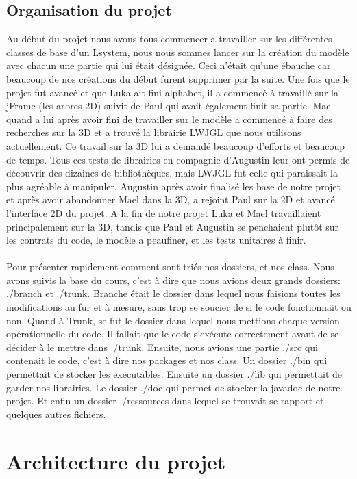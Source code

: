 \documentclass[a4paper,12pt]{article}
\begin{document}
\subsection{Organisation du projet}

Au début du projet nous avons tous commencer a travailler sur les différentes classes de base d'un Lsystem, nous nous sommes lancer sur la création du modèle avec chacun une partie qui lui était désignée. Ceci n'était qu'une ébauche car beaucoup de nos créations du début furent supprimer par la suite. Une fois que le projet fut avancé et que Luka ait fini alphabet, il a commencé à travaillé sur la jFrame (les arbres 2D) suivit de Paul qui avait également finit sa partie. Mael quand a lui après avoir fini de travailler sur le modèle a commencé à faire des recherches sur la 3D et a trouvé la librairie LWJGL que nous utilisons actuellement. Ce travail sur la 3D lui a demandé beaucoup d'efforts et beaucoup de temps. Tous ces tests de librairies en compagnie d'Augustin leur ont permis de découvrir des dizaines de bibliothèques, mais LWJGL fut celle qui paraissait la plus agréable à manipuler. Augustin après avoir finalisé les base de notre projet et après avoir abandonner Mael dans la 3D, a rejoint Paul sur la 2D et avancé l'interface 2D du projet. A la fin de notre projet Luka et Mael travaillaient principalement sur la 3D, tandis que Paul et Augustin se penchaient plutôt sur les contrats du code, le modèle a peaufiner, et les tests unitaires à finir.
\\\\
Pour présenter rapidement comment sont triés nos dossiers, et nos class. Nous avons suivis la base du cours, c'est à dire que nous avions deux grands dossiers: ./branch et ./trunk. Branche était le dossier dans lequel nous faisions toutes les modifications au fur et à mesure, sans trop se soucier de si le code fonctionnait ou non. Quand à Trunk, se fut le dossier dans lequel nous mettions chaque version opérationnelle du code. Il fallait que le code s'exécute correctement avant de se décider à le mettre dans ./trunk. Ensuite, nous avions une partie ./src qui contenait le code, c'est à dire nos packages et nos class. Un dossier ./bin qui permettait de stocker les executables. Ensuite un dossier ./lib qui permettait de garder nos librairies. Le dossier ./doc qui permet de stocker la javadoc de notre projet. Et enfin un dossier ./ressources dans lequel se trouvait se rapport et quelques autres fichiers.


\newpage
\section{Architecture du projet}
\end{document}
